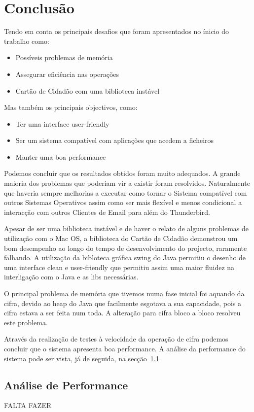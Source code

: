 \chapter{Conclusão}
\label{chapter:conclusions}

Tendo em conta os principais desafios que foram apresentados no ínicio do trabalho como:
\begin{itemize}
\item Possíveis problemas de memória
\item Assegurar eficiência nas operações
\item Cartão de Cidadão com uma biblioteca instável
\end{itemize}
Mas também os principais objectivos, como:
\begin{itemize}
\item Ter uma interface user-friendly
\item Ser um sistema compatível com aplicações que acedem a ficheiros
\item Manter uma boa performance
\end{itemize}

Podemos concluir que os resultados obtidos foram muito adequados.
A grande maioria dos problemas que poderiam vir a existir foram resolvidos. Naturalmente que haveria sempre melhorias a executar como tornar o Sistema compatível com outros Sistemas Operativos assim como ser mais flexível e menos condicional a interacção com outros Clientes de Email para além do Thunderbird.

Apesar de ser uma biblioteca instável e de haver o relato de alguns problemas de utilização com o Mac OS, a biblioteca do Cartão de Cidadão demonstrou um bom desempenho ao longo do tempo de desenvolvimento do projecto, raramente falhando.
A utilização da bibloteca gráfica swing do Java permitiu o desenho de uma interface clean e user-friendly que permitiu assim uma maior fluidez na interligação com o Java e as libs necessárias.

O principal problema de memória que tivemos numa fase inicial foi aquando da cifra, devido ao heap do Java que facilmente esgotava a sua capacidade, pois a cifra estava a ser feita num toda. A alteração para cifra bloco a bloco resolveu este problema.

Através da realização de testes à velocidade da operação de cifra podemos concluir que o sistema apresenta boa performance. A análise da performance do sistema pode ser vista, já de seguida, na secção~\ref{section:performance}

\section{Análise de Performance}
\label{section:performance}

FALTA FAZER